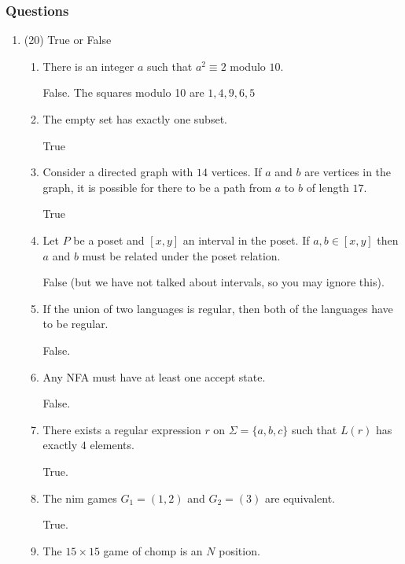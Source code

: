 \documentclass{amsart}
\begin{document}
\subsubsection{Questions}
\label{sec:org64e6f79}
\begin{enumerate}
\item (20) True or False
\label{sec:org3c2c52a}
\begin{enumerate}
\item There is an integer \(a\) such that \(a^2 \equiv 2\) modulo \(10\).
\begin{solution}
False.  The squares modulo 10 are \(1, 4, 9, 6, 5\)
\end{solution}
\item The empty set has exactly one subset.
\begin{solution}
True
\end{solution}
\item Consider a directed graph with \(14\) vertices. If \(a\) and \(b\) are vertices in the graph, it is possible for there to be a path from \(a\) to \(b\) of length \(17\).
\begin{solution}
True
\end{solution}
\item Let \(P\) be a poset and \([x,y]\) an interval in the poset. If \(a, b \in [x,y]\) then \(a\) and \(b\) must be related under the poset relation.
\begin{solution}
False (but we have not talked about intervals, so you may ignore this).
\end{solution}
\item If the union of two languages is regular, then both of the languages have to be regular.
\begin{solution}
False.
\end{solution}
\item Any NFA must have at least one accept state.
\begin{solution}
False.
\end{solution}
\item There exists a regular expression \(r\) on \(\Sigma = \{a,b,c\}\) such that \(L(r)\) has exactly \(4\) elements.
\begin{solution}
True.
\end{solution}
\item The nim games \(G_1 = (1,2)\) and \(G_2 = (3)\) are equivalent.
\begin{solution}
True.
\end{solution}
\item The \(15 \times 15\) game of chomp is an \(N\) position.

\end{enumerate}
\end{enumerate}
\end{document}
